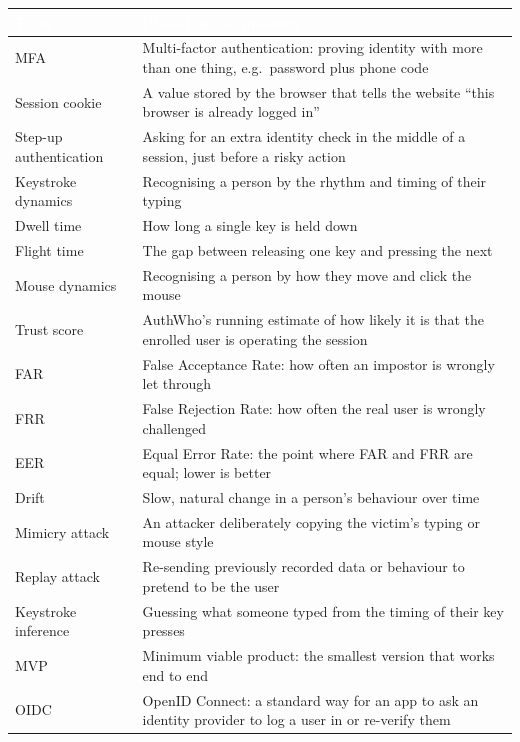 \documentclass[10pt,letterpaper]{article}
\newcommand{\hd}[1]{\textcolor{white}{\bfseries #1}}
\newcommand{\headrow}{\rowcolor{navy}}
\begin{document}
\begin{xltabular}{\textwidth}{P{4.3cm} L}
\headrow \hd{Term} & \hd{Plain-English meaning} \\
\endhead
MFA & Multi-factor authentication: proving identity with more than one thing, e.g.\ password plus phone code \\ \hline
Session cookie & A value stored by the browser that tells the website ``this browser is already logged in'' \\ \hline
Step-up authentication & Asking for an extra identity check in the middle of a session, just before a risky action \\ \hline
Keystroke dynamics & Recognising a person by the rhythm and timing of their typing \\ \hline
Dwell time & How long a single key is held down \\ \hline
Flight time & The gap between releasing one key and pressing the next \\ \hline
Mouse dynamics & Recognising a person by how they move and click the mouse \\ \hline
Trust score & AuthWho's running estimate of how likely it is that the enrolled user is operating the session \\ \hline
FAR & False Acceptance Rate: how often an impostor is wrongly let through \\ \hline
FRR & False Rejection Rate: how often the real user is wrongly challenged \\ \hline
EER & Equal Error Rate: the point where FAR and FRR are equal; lower is better \\ \hline
Drift & Slow, natural change in a person's behaviour over time \\ \hline
Mimicry attack & An attacker deliberately copying the victim's typing or mouse style \\ \hline
Replay attack & Re-sending previously recorded data or behaviour to pretend to be the user \\ \hline
Keystroke inference & Guessing what someone typed from the timing of their key presses \\ \hline
MVP & Minimum viable product: the smallest version that works end to end \\ \hline
OIDC & OpenID Connect: a standard way for an app to ask an identity provider to log a user in or re-verify them \\
\end{xltabular}
\end{document}
